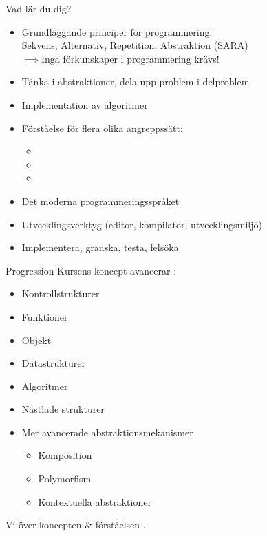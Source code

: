 \begin{Slide}{Vad lär du dig?}
\begin{itemize}
\item Grundläggande principer för programmering:\\ Sekvens, Alternativ, Repetition, Abstraktion (SARA)\\$\implies$Inga förkunskaper i programmering krävs!
\item Tänka i abstraktioner, dela upp problem i delproblem
\item Implementation av algoritmer
\item Förståelse för flera olika angreppssätt:
\begin{itemize}
\item {}%
\item {}%
\item {}%
\end{itemize}
\item Det moderna programmeringsspråket  %
\item Utvecklingsverktyg (editor, kompilator, utvecklingsmiljö)
\item Implementera, granska, testa, felsöka
\end{itemize}
\end{Slide}

\begin{Slide}{Progression}
Kursens koncept avancerar :
\begin{itemize}
\item Kontrollstrukturer
\item Funktioner
\item Objekt
\item Datastrukturer 
\item Algoritmer
\item Nästlade strukturer
\item Mer avancerade abstraktionsmekanismer
\begin{itemize}
\item Komposition
\item Polymorfism
\item Kontextuella abstraktioner
\end{itemize}
\end{itemize}
Vi  över koncepten \&  förståelsen .
\end{Slide}


